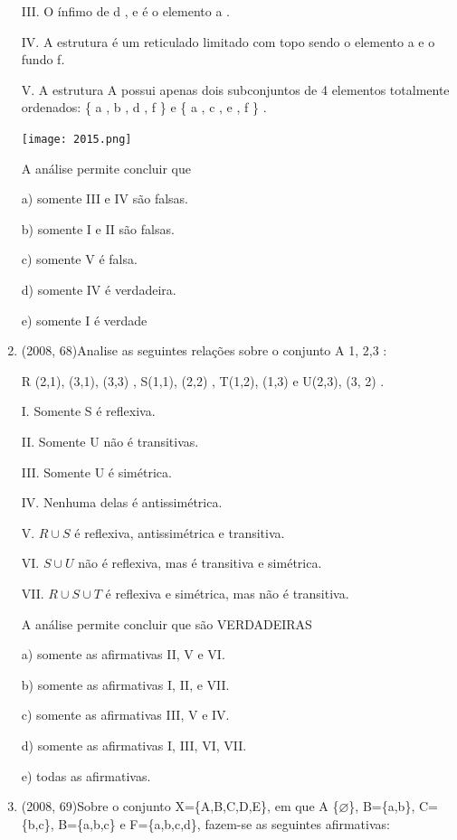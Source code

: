 \documentclass{article}
\begin{document}
\begin{enumerate}
III. O ínfimo de { d , e } é o elemento a .

IV. A estrutura é um reticulado limitado com topo sendo o elemento a e o fundo f.

V. A estrutura A possui apenas dois subconjuntos de 4 elementos totalmente ordenados:
\{ a , b , d , f \} e \{ a , c , e , f \} .

\texttt{[image: 2015.png]}\newline

A análise permite concluir que

a) somente III e IV são falsas.

b) somente I e II são falsas.

c) somente V é falsa.

d) somente IV é verdadeira.

e) somente I é verdade\newline



\item(2008, 68)Analise as seguintes relações sobre o conjunto A {1, 2,3} :

R {(2,1), (3,1), (3,3)} , S{(1,1), (2,2)} , T{(1,2), (1,3)} e U{(2,3), (3, 2)} .\newline

I. Somente S é reflexiva.

II. Somente U não é transitivas.

III. Somente U é simétrica.

IV. Nenhuma delas é antissimétrica.

V. $R\cup S$ é reflexiva, antissimétrica e transitiva.

VI. $S\cup U$ não é reflexiva, mas é transitiva e simétrica.

VII. $R\cup S\cup T$ é reflexiva e simétrica, mas não é transitiva.

A análise permite concluir que são VERDADEIRAS \newline

a) somente as afirmativas II, V e VI.

b) somente as afirmativas I, II, e VII.

c) somente as afirmativas III, V e IV.

d) somente as afirmativas I, III, VI, VII.

e) todas as afirmativas.\newline





\item(2008, 69)Sobre o conjunto X=\{A,B,C,D,E\}, em que A \{$\varnothing$\}, B=\{a,b\}, C=\{b,c\}, B=\{a,b,c\} e F=\{a,b,c,d\}, fazem-se as seguintes afirmativas:\newline


\end{enumerate}
\end{document}

